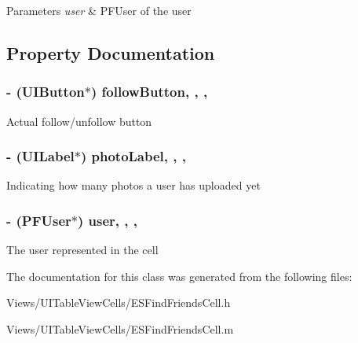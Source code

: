 \begin{DoxyParams}{Parameters}
{\em user} & P\+F\+User of the user \\
\hline
\end{DoxyParams}


\subsection{Property Documentation}
\hypertarget{interface_e_s_find_friends_cell_a373233c7bf89893b9331ff6c3d79b1d8}{}
\subsubsection[{follow\+Button}]{\setlength{\rightskip}{0pt plus 5cm}-\/ (U\+I\+Button$\ast$) follow\+Button\hspace{0.3cm}{\ttfamily [read]}, {\ttfamily [write]}, {\ttfamily [nonatomic]}, {\ttfamily [strong]}}\label{interface_e_s_find_friends_cell_a373233c7bf89893b9331ff6c3d79b1d8}
Actual follow/unfollow button \hypertarget{interface_e_s_find_friends_cell_aaeef0299b56fb58a5558e933d7457f73}{}
\subsubsection[{photo\+Label}]{\setlength{\rightskip}{0pt plus 5cm}-\/ (U\+I\+Label$\ast$) photo\+Label\hspace{0.3cm}{\ttfamily [read]}, {\ttfamily [write]}, {\ttfamily [nonatomic]}, {\ttfamily [strong]}}\label{interface_e_s_find_friends_cell_aaeef0299b56fb58a5558e933d7457f73}
Indicating how many photos a user has uploaded yet \hypertarget{interface_e_s_find_friends_cell_a1b371af71f12d43c4834933d3d6a161f}{}
\subsubsection[{user}]{\setlength{\rightskip}{0pt plus 5cm}-\/ (P\+F\+User$\ast$) user\hspace{0.3cm}{\ttfamily [read]}, {\ttfamily [write]}, {\ttfamily [nonatomic]}, {\ttfamily [strong]}}\label{interface_e_s_find_friends_cell_a1b371af71f12d43c4834933d3d6a161f}
The user represented in the cell 

The documentation for this class was generated from the following files\+:\begin{DoxyCompactItemize}
\item 
Views/\+U\+I\+Table\+View\+Cells/E\+S\+Find\+Friends\+Cell.\+h\item 
Views/\+U\+I\+Table\+View\+Cells/E\+S\+Find\+Friends\+Cell.\+m\end{DoxyCompactItemize}
